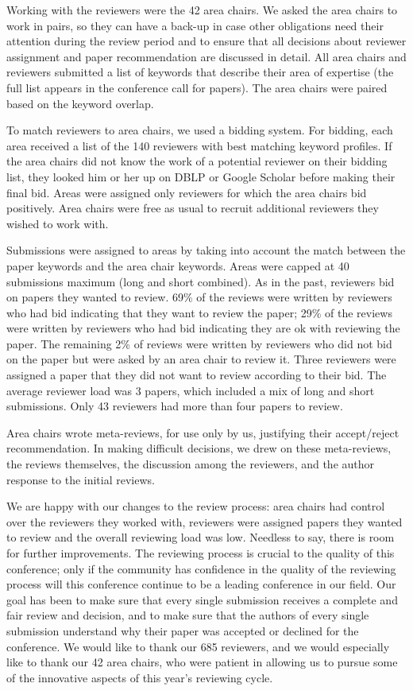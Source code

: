 Working with the reviewers were the 42 area chairs. We asked the area chairs
to work in pairs, so they can have a back-up in case other obligations need 
their attention during the review period and to ensure that all decisions 
about reviewer assignment and paper recommendation are discussed in detail. 
All area chairs and reviewers submitted a list of keywords that describe 
their area of expertise (the full list appears in the conference call for 
papers). The area chairs were paired based on the keyword overlap.

To match reviewers to area chairs, we used a bidding system. For bidding, 
each area received a list of the 140 reviewers with best matching keyword 
profiles. If the area chairs did not know the work of a potential reviewer 
on their bidding list, they looked him or her up on DBLP or Google Scholar 
before making their final bid. Areas were assigned only reviewers for which 
the area chairs bid positively. Area chairs were free as usual to recruit 
additional reviewers they wished to work with.

Submissions were assigned to areas by taking into account the match between 
the paper keywords and the area chair keywords. Areas were capped at 40 
submissions maximum (long and short combined). As in the past, reviewers 
bid on papers they wanted to review. 69\% of the reviews were written by 
reviewers who had bid indicating that they want to review the paper; 29\% 
of the reviews were written by reviewers who had bid indicating they are ok 
with reviewing the paper. The remaining 2\% of reviews were written by 
reviewers who did not bid on the paper but were asked by an area chair to 
review it. Three reviewers were assigned a paper that they did not want to 
review according to their bid. The average reviewer load was 3 papers, which
included a mix of long and short submissions. Only 43 reviewers had more 
than four papers to review.

Area chairs wrote meta-reviews, for use only by us, justifying their 
accept/reject recommendation. In making difficult decisions, we drew on 
these meta-reviews, the reviews themselves, the discussion among the 
reviewers, and the author response to the initial reviews.

We are happy with our changes to the review process: area chairs had control
over the reviewers they worked with, reviewers were assigned papers they 
wanted to review and the overall reviewing load was low. Needless to say, 
there is room for further improvements. The reviewing process is crucial to 
the quality of this conference; only if the community has confidence in the 
quality of the reviewing process will this conference continue to be a 
leading conference in our field. Our goal has been to make sure that every 
single submission receives a complete and fair review and decision, and to 
make sure that the authors of every single submission understand why their 
paper was accepted or declined for the conference. We would like to thank 
our 685 reviewers, and we would especially like to thank our 42 area chairs,
who were patient in allowing us to pursue some of the innovative aspects of 
this year’s reviewing cycle.


